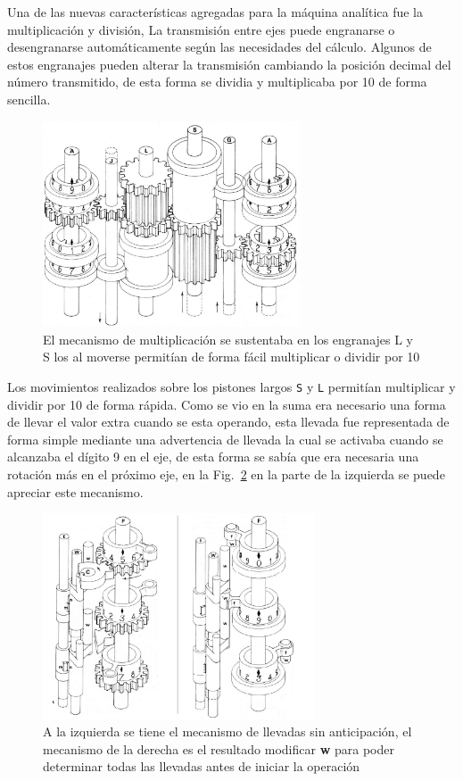 \documentclass[runningheads,a4paper]{llncs}
\begin{document}
Una de las nuevas características agregadas para la máquina analítica fue la multiplicación y división, 
La transmisión entre ejes puede engranarse o desengranarse automáticamente según las necesidades del 
cálculo. Algunos de estos engranajes pueden alterar la transmisión cambiando la posición decimal del 
número transmitido, de esta forma se dividia y multiplicaba por 10 de forma sencilla.

\begin{figure}
	\centering
	\includegraphics[height=6.1cm]{imgs/Mult}
	\caption{El mecanismo de multiplicación se sustentaba en los engranajes L y S los al moverse permitían de forma 
	fácil multiplicar o dividir por 10}
	\label{fig:Mult}
\end{figure}

Los movimientos realizados sobre los pistones largos \verb*|S| y \verb*|L| permitían multiplicar y 
dividir por 10 de forma rápida. Como se vio en la suma era necesario una forma de llevar el valor extra 
cuando se esta operando, esta llevada fue representada de forma simple mediante una advertencia de 
llevada la cual se activaba cuando se alcanzaba el dígito 9 en el eje, de esta forma se sabía que 
era necesaria una rotación más en el próximo eje, en la Fig.~\ref{fig:Carry} en la parte de la izquierda 
se puede apreciar este mecanismo.

\begin{figure}
	\centering
	\includegraphics[height=6.1cm]{imgs/Carry}
	\caption{A la izquierda se tiene el mecanismo de llevadas sin anticipación, el mecanismo de la derecha es el resultado modificar \textbf{w} para poder determinar todas las llevadas antes de iniciar la operación}
	\label{fig:Carry}
\end{figure}
\end{document}

